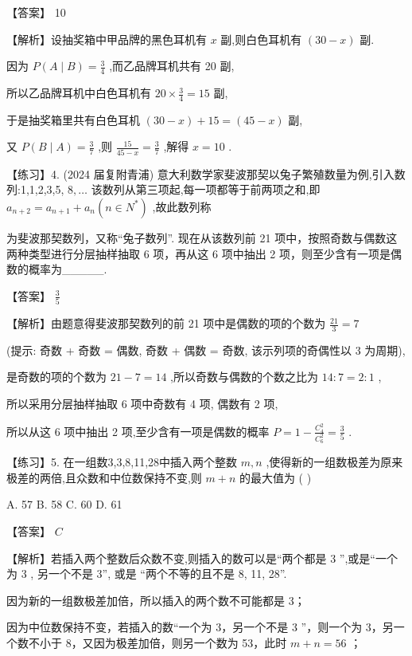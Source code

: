 \documentclass[10pt]{article}
\newcommand*\circled[1]{\tikz[baseline=(char.base)]{\node[shape=circle,draw,inner sep=1.5pt] (char) {\small #1};}}
\begin{document}
【答案】 10

【解析】设抽奖箱中甲品牌的黑色耳机有 \(x\) 副,则白色耳机有 \(\left( {{30} - x}\right)\) 副.

因为 \(P\left( {A \mid  B}\right)  = \frac{3}{4}\) ,而乙品牌耳机共有 20 副,

所以乙品牌耳机中白色耳机有 \({20} \times  \frac{3}{4} = {15}\) 副,

于是抽奖箱里共有白色耳机 \(\left( {{30} - x}\right)  + {15} = \left( {{45} - x}\right)\) 副,

又 \(P\left( {B \mid  A}\right)  = \frac{3}{7}\) ,则 \(\frac{15}{{45} - x} = \frac{3}{7}\) ,解得 \(x = {10}\) .

【练习】4. (2024 届复附青浦) 意大利数学家斐波那契以兔子繁殖数量为例,引入数列:1,1,2,3,5, \(8,\ldots\) 该数列从第三项起,每一项都等于前两项之和,即 \({a}_{n + 2} = {a}_{n + 1} + {a}_{n}\left( {n \in  {N}^{ * }}\right)\) ,故此数列称

为斐波那契数列，又称“兔子数列”. 现在从该数列前 21 项中，按照奇数与偶数这两种类型进行分层抽样抽取 6 项，再从这 6 项中抽出 2 项，则至少含有一项是偶数的概率为\_\_\_\_\_.

【答案】 \(\frac{3}{5}\)

【解析】由题意得斐波那契数列的前 21 项中是偶数的项的个数为 \(\frac{21}{3} = 7\)

(提示: 奇数 + 奇数 = 偶数, 奇数 + 偶数 = 奇数, 该示列项的奇偶性以 3 为周期),

是奇数的项的个数为 \({21} - 7 = {14}\) ,所以奇数与偶数的个数之比为 \({14} : 7 = 2 : 1\) ,

所以采用分层抽样抽取 6 项中奇数有 4 项, 偶数有 2 项,

所以从这 6 项中抽出 2 项,至少含有一项是偶数的概率 \(P = 1 - \frac{{C}_{4}^{2}}{{C}_{6}^{2}} = \frac{3}{5}\) .

【练习】5. 在一组数3,3,8,11,28中插入两个整数 \(m,n\) ,使得新的一组数极差为原来极差的两倍,且众数和中位数保持不变,则 \(m + n\) 的最大值为 ( )

A. 57 B. 58 C. 60 D. 61

【答案】 \(C\)

【解析】若插入两个整数后众数不变,则插入的数可以是“两个都是 3 ”,或是“一个为 3 , 另一个不是 3”, 或是 “两个不等的且不是 8, 11, 28”.

 \circled{1} 因为新的一组数极差加倍，所以插入的两个数不可能都是 3；

 \circled{2} 因为中位数保持不变，若插入的数“一个为 3，另一个不是 3 ”，则一个为 3，另一个数不小于 8，又因为极差加倍，则另一个数为 53，此时 \(m + n = {56}\) ；
\end{document}
